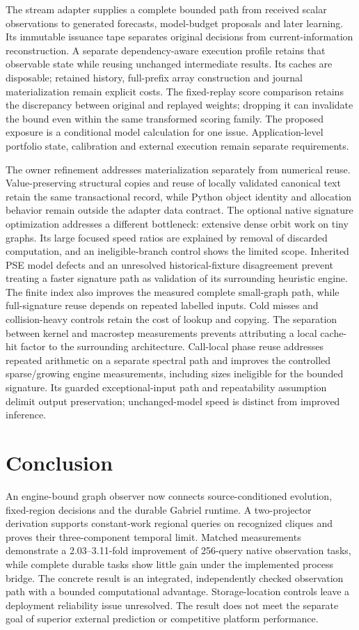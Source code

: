 \documentclass[11pt,a4paper]{article}
\theoremstyle{definition}\newtheorem{definition}[theorem]{Definition}
\begin{document}
The stream adapter supplies a complete bounded path from received scalar observations to generated forecasts, model-budget proposals and later learning. Its immutable issuance tape separates original decisions from current-information reconstruction. A separate dependency-aware execution profile retains that observable state while reusing unchanged intermediate results. Its caches are disposable; retained history, full-prefix array construction and journal materialization remain explicit costs. The fixed-replay score comparison retains the discrepancy between original and replayed weights; dropping it can invalidate the bound even within the same transformed scoring family. The proposed exposure is a conditional model calculation for one issue. Application-level portfolio state, calibration and external execution remain separate requirements.

The owner refinement addresses materialization separately from numerical reuse. Value-preserving structural copies and reuse of locally validated canonical text retain the same transactional record, while Python object identity and allocation behavior remain outside the adapter data contract. The optional native signature optimization addresses a different bottleneck: extensive dense orbit work on tiny graphs. Its large focused speed ratios are explained by removal of discarded computation, and an ineligible-branch control shows the limited scope. Inherited PSE model defects and an unresolved historical-fixture disagreement prevent treating a faster signature path as validation of its surrounding heuristic engine. The finite index also improves the measured complete small-graph path, while full-signature reuse depends on repeated labelled inputs. Cold misses and collision-heavy controls retain the cost of lookup and copying. The separation between kernel and macrostep measurements prevents attributing a local cache-hit factor to the surrounding architecture. Call-local phase reuse addresses repeated arithmetic on a separate spectral path and improves the controlled sparse/growing engine measurements, including sizes ineligible for the bounded signature. Its guarded exceptional-input path and repeatability assumption delimit output preservation; unchanged-model speed is distinct from improved inference.

\section{Conclusion}
An engine-bound graph observer now connects source-conditioned evolution, fixed-region decisions and the durable Gabriel runtime. A two-projector derivation supports constant-work regional queries on recognized cliques and proves their three-component temporal limit. Matched measurements demonstrate a 2.03--3.11-fold improvement of 256-query native observation tasks, while complete durable tasks show little gain under the implemented process bridge. The concrete result is an integrated, independently checked observation path with a bounded computational advantage. Storage-location controls leave a deployment reliability issue unresolved. The result does not meet the separate goal of superior external prediction or competitive platform performance.
\end{document}
